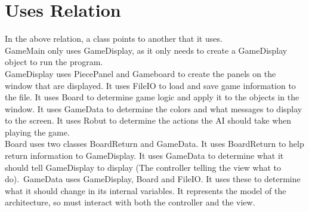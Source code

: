\documentclass[12pt]{article}
\begin{document}
	\section{Uses Relation}
			\begin{figure}[!h]
				\centering
			\end{figure}
\noindent	In the above relation, a class points to another that it uses.\\
	GameMain only uses GameDisplay, as it only needs to create a GameDisplay object to run the program.\\ GameDisplay uses PiecePanel and Gameboard to create the panels on the window that are displayed. It uses FileIO to load and save game information to the file. It uses Board to determine game logic and apply it to the objects in the window. It uses GameData to determine the colors and what messages to display to the screen. It uses Robut to determine the actions the AI should take when playing the game. \\
	Board uses two classes BoardReturn and GameData. It uses BoardReturn to help return information to GameDisplay. It uses GameData to determine what it should tell GameDisplay to display (The controller telling the view what to do).\
	GameData uses GameDisplay, Board and FileIO. It uses these to determine what it should change in its internal variables. It represents the model of the architecture, so must interact with both the controller and the view. \\
	
\end{document}

